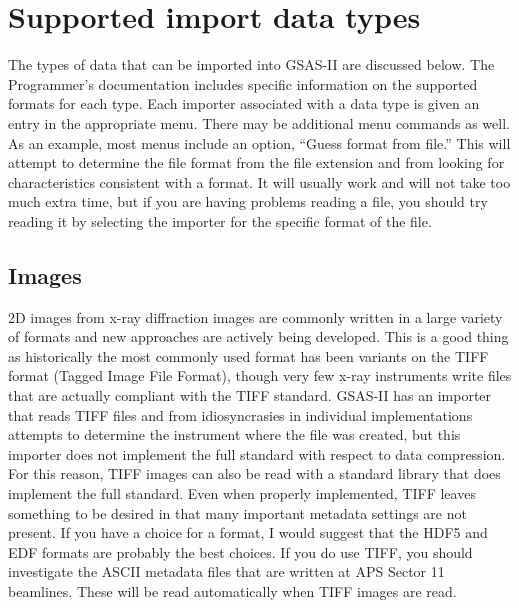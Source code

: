 \section{Supported import data types}
The types of data that can be imported into GSAS-II are discussed below. The Programmer's documentation includes specific information on the supported formats for each type. Each importer associated with a data type is given an entry in the appropriate menu. There may be additional menu commands as well. As an example, most menus include an option, ``Guess format from file.'' This will attempt to determine the file format from the file extension and from looking for characteristics consistent with a format. It will usually work and will not take too much extra time, but if you are having problems reading a file, you should try reading it by selecting the importer for the specific format of the file. 

\subsection{Images}
2D images from x-ray diffraction images are commonly written in a large variety of formats and new approaches are actively being developed. This is a good thing as historically the most commonly used format has been variants on the TIFF format (Tagged Image File Format), though very few x-ray instruments write files that are actually compliant with the TIFF standard. GSAS-II has an importer that reads TIFF files and from idiosyncrasies in individual implementations attempts to determine the instrument where the file was created, but this importer does not implement the full standard with respect to data compression. For this reason, TIFF images can also be read with a standard library that does implement the full standard. Even when properly implemented, TIFF leaves something to be desired in that many important metadata settings are not present. If you have a choice for a format, I would suggest that the HDF5 and EDF formats are probably the best choices. If you do use TIFF, you should investigate the ASCII metadata files that are written at APS Sector 11 beamlines. These will be read automatically when TIFF images are read. 
